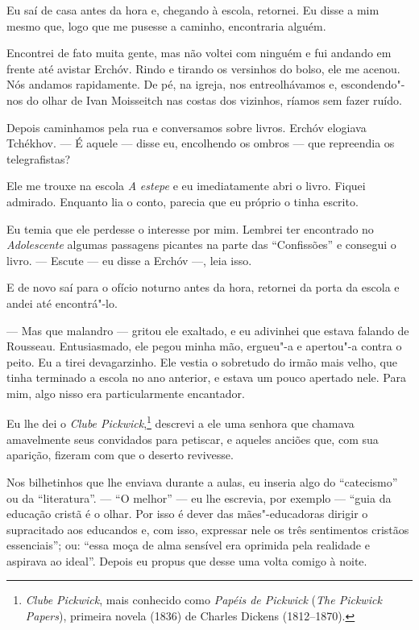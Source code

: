 Eu saí de casa antes da hora e, chegando à escola, retornei. Eu disse a
mim mesmo que, logo que me pusesse a caminho, encontraria alguém.

Encontrei de fato muita gente, mas não voltei com ninguém e fui andando
em frente até avistar Erchóv. Rindo e tirando os versinhos do bolso, ele
me acenou. Nós andamos rapidamente. De pé, na igreja, nos entreolhávamos
e, escondendo"-nos do olhar de Ivan Moisseitch nas costas dos vizinhos,
ríamos sem fazer ruído.

Depois caminhamos pela rua e conversamos sobre livros. Erchóv elogiava
Tchékhov. --- É aquele --- disse eu, encolhendo os ombros --- que
repreendia os telegrafistas?

Ele me trouxe na escola \emph{A} \emph{estepe} e eu imediatamente abri o
livro. Fiquei admirado. Enquanto lia o conto, parecia que eu próprio o
tinha escrito.

Eu temia que ele perdesse o interesse por mim. Lembrei ter encontrado no
\emph{Adolescente} algumas passagens picantes na parte das
``Confissões'' e consegui o livro. --- Escute --- eu disse a Erchóv ---,
leia isso.

E de novo saí para o ofício noturno antes da hora, retornei da porta da
escola e andei até encontrá"-lo.

--- Mas que malandro --- gritou ele exaltado, e eu adivinhei que estava
falando de Rousseau. Entusiasmado, ele pegou minha mão, ergueu"-a e
apertou"-a contra o peito. Eu a tirei devagarzinho. Ele vestia o
sobretudo do irmão mais velho, que tinha terminado a escola no ano
anterior, e estava um pouco apertado nele. Para mim, algo nisso era
particularmente encantador.

Eu lhe dei o \emph{Clube Pickwick},\footnote{\emph{Clube Pickwick}, mais
  conhecido como \emph{Papéis de Pickwick} (\emph{The Pickwick Papers}),
  primeira novela (1836) de Charles Dickens (1812--1870).} descrevi a
ele uma senhora que chamava amavelmente seus convidados para petiscar, e
aqueles anciões que, com sua aparição, fizeram com que o deserto
revivesse.

Nos bilhetinhos que lhe enviava durante a aulas, eu inseria algo do
``catecismo'' ou da ``literatura''. --- ``O melhor'' --- eu lhe
escrevia, por exemplo --- ``guia da educação cristã é o olhar. Por isso
é dever das mães"-educadoras dirigir o supracitado aos educandos e, com
isso, expressar nele os três sentimentos cristãos essenciais''; ou:
``essa moça de alma sensível era oprimida pela realidade e aspirava ao
ideal''. Depois eu propus que desse uma volta comigo à noite.

